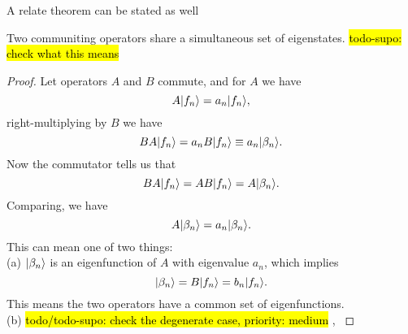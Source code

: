 A relate theorem can be stated as well
\begin{thrm}
\label{simul_eig}
Two communiting operators share a simultaneous set of eigenstates. \hl{todo-supo: check what this means}
\end{thrm}
\begin{proof}
Let operators $A$ and $B$ commute, and for $A$ we have
\begin{equation}
A|f_n\rangle=a_n|f_n\rangle, 
\end{equation}
right-multiplying by $B$ we have
\begin{equation}
BA|f_n\rangle=a_nB|f_n\rangle\equiv a_n|\beta_n\rangle.
\end{equation}
Now the commutator tells us that
\begin{equation}
BA|f_n\rangle=AB|f_n\rangle=A|\beta_n\rangle.
\end{equation}
Comparing, we have
\begin{equation}
A|\beta_n\rangle=a_n|\beta_n\rangle.
\end{equation}
This can mean one of two things:\\
(a) $|\beta_n\rangle$ is an eigenfunction of $A$ with eigenvalue $a_n$, 
which implies
\begin{equation}
|\beta_n\rangle=B|f_n\rangle=b_n|f_n\rangle.
\end{equation}
This means the two operators have a common set of eigenfunctions.\\
(b) \hl{todo/todo-supo: check the degenerate case, priority: medium} \cite{simuleig1}, \cite{simuleig2}
\end{proof}

